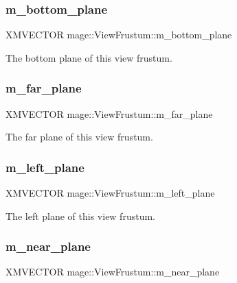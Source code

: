 \subsubsection{\texorpdfstring{m\+\_\+bottom\+\_\+plane}{m\_bottom\_plane}}
{\footnotesize\ttfamily X\+M\+V\+E\+C\+T\+OR mage\+::\+View\+Frustum\+::m\+\_\+bottom\+\_\+plane}

The bottom plane of this view frustum. \hypertarget{structmage_1_1_view_frustum_a02e8a940302c6c2a0d489f0fe35e7f19}{}\label{structmage_1_1_view_frustum_a02e8a940302c6c2a0d489f0fe35e7f19} 
\subsubsection{\texorpdfstring{m\+\_\+far\+\_\+plane}{m\_far\_plane}}
{\footnotesize\ttfamily X\+M\+V\+E\+C\+T\+OR mage\+::\+View\+Frustum\+::m\+\_\+far\+\_\+plane}

The far plane of this view frustum. \hypertarget{structmage_1_1_view_frustum_a07375137f59a785cf123c9feca08d393}{}\label{structmage_1_1_view_frustum_a07375137f59a785cf123c9feca08d393} 
\subsubsection{\texorpdfstring{m\+\_\+left\+\_\+plane}{m\_left\_plane}}
{\footnotesize\ttfamily X\+M\+V\+E\+C\+T\+OR mage\+::\+View\+Frustum\+::m\+\_\+left\+\_\+plane}

The left plane of this view frustum. \hypertarget{structmage_1_1_view_frustum_a3f8e1216b85b0f19839229c9cc9d97fb}{}\label{structmage_1_1_view_frustum_a3f8e1216b85b0f19839229c9cc9d97fb} 
\subsubsection{\texorpdfstring{m\+\_\+near\+\_\+plane}{m\_near\_plane}}
{\footnotesize\ttfamily X\+M\+V\+E\+C\+T\+OR mage\+::\+View\+Frustum\+::m\+\_\+near\+\_\+plane}

